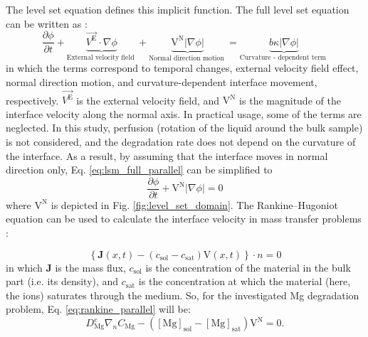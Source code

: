 The level set equation defines this implicit function. The full level set equation can be written as \cite{RonaldFedkiw2002}:
\begin{equation} \label{eq:lsm_full_parallel}
\frac{\partial \phi}{\partial t}+\underbrace{\overrightarrow{V^\mathrm{E}} \cdot \nabla \phi}_{\text {External velocity field }}+\underbrace{\mathrm{V}^\mathrm{N}|\nabla \phi|}_{\text {Normal direction motion }}=\underbrace{b \kappa|\nabla \phi|}_{\text {Curvature - dependent term }}
\end{equation}
in which the terms correspond to temporal changes, external velocity field effect, normal direction motion, and curvature-dependent interface movement, respectively.
$\overrightarrow{V^\mathrm{E}}$ is the external velocity field, and  $\mathrm{V}^\mathrm{N}$ is the magnitude of the interface velocity along the normal axis. In practical usage, some of the terms are  neglected. In this study, perfusion (rotation of the liquid around the bulk sample) is not considered, and the degradation rate does not depend on the curvature of the interface. As a result, by assuming that the interface moves in normal direction only, Eq. \ref{eq:lsm_full_parallel} can be simplified to
\begin{equation} \label{eq:lsm_simplified_parallel}
\frac{\partial \phi}{\partial t}+\mathrm{V}^\mathrm{N}|\nabla \phi|=0
\end{equation}
\noindent where $\mathrm{V}^\mathrm{N}$ is depicted in Fig. \ref{fig:level_set_domain}. The Rankine–Hugoniot equation can be used to calculate the interface velocity in mass transfer problems \cite{Scheiner2007}:

\begin{equation} \label{eq:rankine_parallel}
\left\{\mathbf{J}(x, t)-\left(c_{\mathrm{sol}}-c_{\mathrm{sat}}\right) \mathrm{V}(x, t)\right\} \cdot n=0
\end{equation}
\noindent in which $\mathbf{J}$ is the mass flux, $c_{\mathrm{sol}}$ is the concentration of the material in the bulk part (i.e. its density), and $c_{\mathrm{sat}}$ is the concentration at which the material (here, the ions) saturates through the medium. So, for the investigated Mg degradation problem, Eq. \ref{eq:rankine_parallel} will be:
\begin{equation} \label{eq:rankine_mg}
D_{\mathrm{Mg}}^{e} \nabla_{n} C_\mathrm{Mg}-\left([\mathrm{Mg}]_{\mathrm{sol}}-[\mathrm{Mg}]_{\mathrm{sat}}\right) \mathrm{V}^\mathrm{N}=0.
\end{equation}

